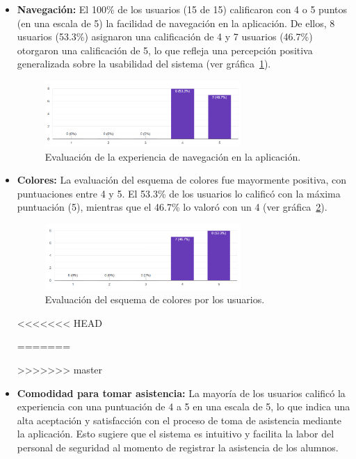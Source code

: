 \begin{itemize}
	\item \textbf{Navegación:}  
	El 100\% de los usuarios (15 de 15) calificaron con 4 o 5 puntos (en una escala de 5) la facilidad de navegación en la aplicación. De ellos, 8 usuarios (53.3\%) asignaron una calificación de 4 y 7 usuarios (46.7\%) otorgaron una calificación de 5, lo que refleja una percepción positiva generalizada sobre la usabilidad del sistema (ver gráfica~\ref{fig:navegacion}).
	
	\begin{figure}[H]
		\centering
		\includegraphics[width=0.7\textwidth]{images/navegacion.png}
		\caption{Evaluación de la experiencia de navegación en la aplicación.}
		\label{fig:navegacion}
	\end{figure}
	
	\item \textbf{Colores:}  
	La evaluación del esquema de colores fue mayormente positiva, con puntuaciones entre 4 y 5. El 53.3\% de los usuarios lo calificó con la máxima puntuación (5), mientras que el 46.7\% lo valoró con un 4 (ver gráfica~\ref{fig:colores}).
	
	\begin{figure}[H]
		\centering
		\includegraphics[width=0.7\textwidth]{images/colores.png}
		\caption{Evaluación del esquema de colores por los usuarios.}
		\label{fig:colores}
	\end{figure}
	
<<<<<<< HEAD
	
=======


>>>>>>> master
	\item \textbf{Comodidad para tomar asistencia:}  
	La mayoría de los usuarios calificó la experiencia con una puntuación de 4 a 5 en una escala de 5, lo que indica una alta aceptación y satisfacción con el proceso de toma de asistencia mediante la aplicación. Esto sugiere que el sistema es intuitivo y facilita la labor del personal de seguridad al momento de registrar la asistencia de los alumnos.
\end{itemize}

